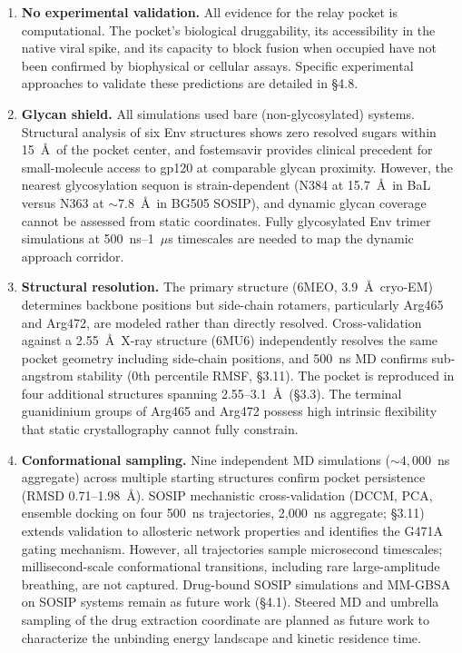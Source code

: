 \documentclass[11pt,a4paper]{article}
\begin{document}
\begin{enumerate}[nosep,leftmargin=1.5em]
    \item \textbf{No experimental validation.} All evidence for the relay pocket is computational. The pocket's biological druggability, its accessibility in the native viral spike, and its capacity to block fusion when occupied have not been confirmed by biophysical or cellular assays. Specific experimental approaches to validate these predictions are detailed in \S4.8.

    \item \textbf{Glycan shield.} All simulations used bare (non-glycosylated) systems. Structural analysis of six Env structures shows zero resolved sugars within 15~\AA\ of the pocket center, and fostemsavir provides clinical precedent for small-molecule access to gp120 at comparable glycan proximity. However, the nearest glycosylation sequon is strain-dependent (N384 at 15.7~\AA\ in BaL versus N363 at ${\sim}$7.8~\AA\ in BG505 SOSIP), and dynamic glycan coverage cannot be assessed from static coordinates. Fully glycosylated Env trimer simulations at 500~ns--1~$\mu$s timescales are needed to map the dynamic approach corridor.

    \item \textbf{Structural resolution.} The primary structure (6MEO, 3.9~\AA\ cryo-EM) determines backbone positions but side-chain rotamers, particularly Arg465 and Arg472, are modeled rather than directly resolved. Cross-validation against a 2.55~\AA\ X-ray structure (6MU6) independently resolves the same pocket geometry including side-chain positions, and 500~ns MD confirms sub-angstrom stability (0th percentile RMSF, \S3.11). The pocket is reproduced in four additional structures spanning 2.55--3.1~\AA\ (\S3.3). The terminal guanidinium groups of Arg465 and Arg472 possess high intrinsic flexibility that static crystallography cannot fully constrain.

    \item \textbf{Conformational sampling.} Nine independent MD simulations (${\sim}4{,}000$~ns aggregate) across multiple starting structures confirm pocket persistence (RMSD 0.71--1.98~\AA). SOSIP mechanistic cross-validation (DCCM, PCA, ensemble docking on four 500~ns trajectories, 2,000~ns aggregate; \S3.11) extends validation to allosteric network properties and identifies the G471A gating mechanism. However, all trajectories sample microsecond timescales; millisecond-scale conformational transitions, including rare large-amplitude breathing, are not captured. Drug-bound SOSIP simulations and MM-GBSA on SOSIP systems remain as future work (\S4.1). Steered MD and umbrella sampling of the drug extraction coordinate are planned as future work to characterize the unbinding energy landscape and kinetic residence time.


\end{enumerate}
\end{document}
